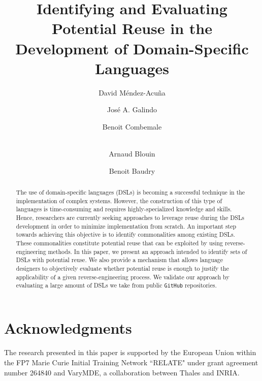 \documentclass[runningheads,a4paper]{llncs}
\begin{document}
\mainmatter  %

\title{Identifying and Evaluating Potential Reuse in the Development of Domain-Specific Languages}


\author{David M\'endez-Acu\~na \and Jos\'e A. Galindo \and Benoit Combemale \and \\ Arnaud Blouin \and Benoit Baudry}

\maketitle

\begin{abstract} 

The use of domain-specific languages (DSLs) is becoming a successful technique in the implementation of complex systems. However, the construction of this type of languages is time-consuming and requires highly-specialized knowledge and skills. Hence, researchers are currently seeking approaches to leverage reuse during the DSLs development in order to minimize implementation from scratch. An important step towards achieving this objective is to identify commonalities among existing DSLs. These commonalities constitute potential reuse that can be exploited by using reverse-engineering methods. In this paper, we present an approach intended to identify sets of DSLs with potential reuse. We also provide a mechanism that allows language designers to objectively evaluate whether potential reuse is enough to justify the applicability of a given reverse-engineering process. We validate our approach by evaluating a large amount of DSLs we take from public \texttt{GitHub} repositories.

\end{abstract}



%

%
%
%
%
%

\section*{Acknowledgments}
The research presented in this paper is supported by the European Union within the FP7 Marie Curie Initial Training Network ``RELATE" under grant agreement number 264840 and VaryMDE, a collaboration between Thales and INRIA.



\end{document}
